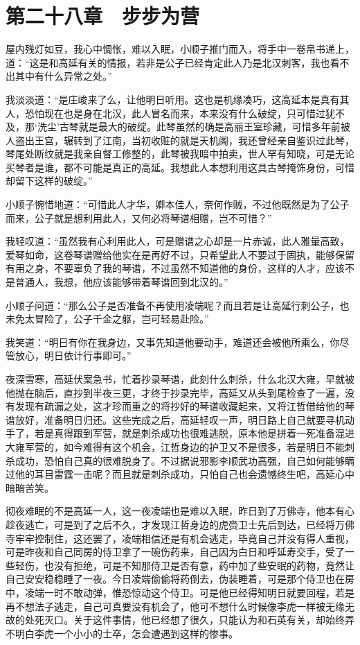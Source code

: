 \chapter{第二十八章　步步为营}

屋内残灯如豆，我心中惆怅，难以入眠，小顺子推门而入，将手中一卷帛书递上，道：“这是和高延有关的情报，若非是公子已经肯定此人乃是北汉刺客，我也看不出其中有什么异常之处。”

我淡淡道：“是庄峻来了么，让他明日听用。这也是机缘凑巧，这高延本是真有其人，恐怕现在也是身在北汉，此人冒名而来，本来没有什么破绽，只可惜过犹不及，那‘洗尘’古琴就是最大的破绽。此琴虽然的确是高丽王室珍藏，可惜多年前被人盗出王宫，辗转到了江南，当初收赃的就是天机阁，我还曾经亲自鉴识过此琴，琴尾处断纹就是我亲自督工修整的，此琴被我暗中拍卖，世人罕有知晓，可是无论买琴者是谁，都不可能是真正的高延。我想此人本想利用这具古琴掩饰身份，可惜却留下这样的破绽。”

小顺子惋惜地道：“可惜此人才华，卿本佳人，奈何作贼，不过他既然是为了公子而来，公子就是想利用此人，又何必将琴谱相赠，岂不可惜？”

我轻叹道：“虽然我有心利用此人，可是赠谱之心却是一片赤诚，此人雅量高致，爱琴如命，这卷琴谱赠给他实在是再好不过，只希望此人不要过于固执，能够保留有用之身，不要辜负了我的琴谱，不过虽然不知道他的身份，这样的人才，应该不是普通人，我想，他应该能够带着琴谱回到北汉的。”

小顺子问道：“那么公子是否准备不再使用凌端呢？而且若是让高延行刺公子，也未免太冒险了，公子千金之躯，岂可轻易赴险。”

我笑道：“明日有你在我身边，又事先知道他要动手，难道还会被他所乘么，你尽管放心，明日依计行事即可。”

夜深雪寒，高延伏案急书，忙着抄录琴谱，此刻什么刺杀，什么北汉大雍，早就被他抛在脑后，直抄到半夜三更，才终于抄录完毕，高延又从头到尾检查了一遍，没有发现有疏漏之处，这才珍而重之的将抄好的琴谱收藏起来，又将江哲借给他的琴谱放好，准备明日归还。这些完成之后，高延轻叹一声，明日路上自己就要寻机动手了，若是真得跟到军营，就是刺杀成功也很难逃脱，原本他是拼着一死准备混进大雍军营的，如今难得有这个机会，江哲身边的护卫又不是很多，若是明日不能刺杀成功，恐怕自己真的很难脱身了。不过据说邪影李顺武功高强，自己如何能够瞒过他的耳目雷霆一击呢？而且就是刺杀成功，只怕自己也会遗憾终生吧，高延心中暗暗苦笑。

彻夜难眠的不是高延一人，这一夜凌端也是难以入眠，昨日到了万佛寺，他本有心趁夜逃亡，可是到了之后不久，才发现江哲身边的虎赍卫士先后到达，已经将万佛寺牢牢控制住，这还罢了，凌端相信还是有机会逃走，毕竟自己并没有得人重视，可是昨夜和自己同房的侍卫拿了一碗伤药来，自己因为白日和呼延寿交手，受了一些轻伤，也没有拒绝，可是不知那侍卫是否有意，药中加了些安眠的药物，竟然让自己安安稳稳睡了一夜。今日凌端偷偷将药倒去，伪装睡着，可是那个侍卫也在房中，凌端一时不敢动弹，惟恐惊动这个侍卫。可是他已经得知明日就要回程，若是再不想法子逃走，自己可真要没有机会了，他可不想什么时候像李虎一样被无缘无故的处死灭口。关于这件事情，他已经想了很久，只能认为和石英有关，却始终弄不明白李虎一个小小的士卒，怎会遭遇到这样的惨事。

